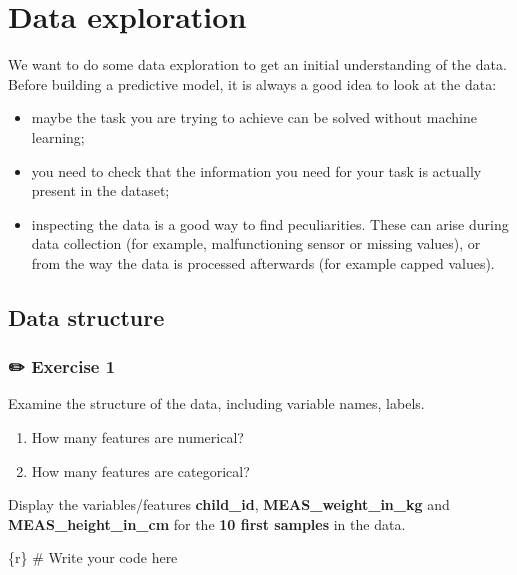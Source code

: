 \documentclass[
  letterpaper,
  DIV=11,
  numbers=noendperiod,
  oneside]{scrreprt}
\newenvironment{Shaded}{\begin{snugshade}}{\end{snugshade}}
\newcommand{\CommentTok}[1]{\textcolor[rgb]{0.37,0.37,0.37}{#1}}
\newcommand{\InformationTok}[1]{\textcolor[rgb]{0.37,0.37,0.37}{#1}}
\providecommand{\tightlist}{%
  \setlength{\itemsep}{0pt}\setlength{\parskip}{0pt}}\usepackage{longtable,booktabs,array}
\begin{document}
\hypertarget{data-exploration}{%
\section{Data exploration}\label{data-exploration}}

We want to do some data exploration to get an initial understanding of
the data. Before building a predictive model, it is always a good idea
to look at the data:

\begin{itemize}
\tightlist
\item
  maybe the task you are trying to achieve can be solved without machine
  learning;
\item
  you need to check that the information you need for your task is
  actually present in the dataset;
\item
  inspecting the data is a good way to find peculiarities. These can
  arise during data collection (for example, malfunctioning sensor or
  missing values), or from the way the data is processed afterwards (for
  example capped values).
\end{itemize}

\hypertarget{data-structure}{%
\subsection{Data structure}\label{data-structure}}

\hypertarget{exercise-1-5}{%
\subsubsection{\texorpdfstring{{✏️} Exercise
1}{✏️ Exercise 1}}\label{exercise-1-5}}

Examine the structure of the data, including variable names, labels.

\begin{enumerate}
\def\labelenumi{\arabic{enumi}.}
\tightlist
\item
  How many features are numerical?
\item
  How many features are categorical?
\end{enumerate}

Display the variables/features \textbf{child\_id},
\textbf{MEAS\_weight\_in\_kg} and \textbf{MEAS\_height\_in\_cm} for the
\textbf{10 first samples} in the data.

\begin{Shaded}
\begin{Highlighting}[]
\InformationTok{\textasciigrave{}\textasciigrave{}\textasciigrave{}\{r\}}
\CommentTok{\# Write your code here}
\InformationTok{\textasciigrave{}\textasciigrave{}\textasciigrave{}}
\end{Highlighting}
\end{Shaded}
\end{document}
